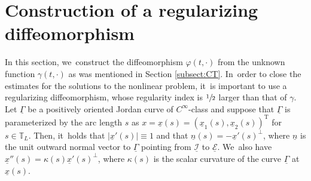 \documentclass[JEP,XML,SOM,Unicode,NoFloatCountersInSection,published]{cedram}
\newcommand{\cI}{{\mathcal I}}
\newcommand{\cE}{{\mathcal E}}
\newcommand{\ul}[1]{\underline{#1}}
\newcommand{\itGamma}{\mathit{\Gamma}}
\theoremstyle{definition}
\begin{document}
\section{Construction of a regularizing diffeomorphism}\label{sect:diffeo}
In this section, we~construct the diffeomorphism $\varphi(t,\cdot)$ from the unknown function $\gamma(t,\cdot)$ as was mentioned in Section \ref{subsect:CT}. In~order to close the estimates for the solutions to the nonlinear problem, it~is important to use a regularizing diffeomorphism, whose regularity index is
$\sfrac12$ larger than that of $\gamma$.
Let $\ul{\itGamma}$ be a positively oriented Jordan curve of $C^\infty$-class and suppose that $\ul{\itGamma}$ is parameterized by the arc length $s$ as
$x = \ul{x}(s) = (\ul{x}_1(s),\ul{x}_2(s))^\mathrm{T}$ for $s \in \mathbb{T}_L$.
Then, it~holds that $|\ul{x}'(s)| \equiv 1$ and that $\ul{n}(s)=-\ul{x}'(s)^\perp$, where $\ul{n}$ is the unit outward normal vector to $\ul{\itGamma}$
pointing from $\ul{\cI}$ to $\ul{\cE}$. We~also have $\ul{x}''(s)=\kappa(s)\ul{x}'(s)^\perp$, where $\kappa(s)$ is the scalar curvature of the curve $\ul{\itGamma}$ at $\ul{x}(s)$.
\end{document}

